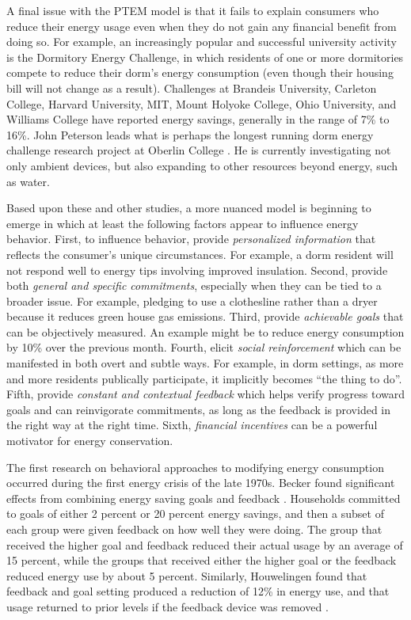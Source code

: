 A final issue with the PTEM model is that it fails to explain consumers who
reduce their energy usage even when they do not gain any financial benefit
from doing so.  For example, an increasingly popular and successful
university activity is the Dormitory Energy Challenge, in which residents
of one or more dormitories compete to reduce their dorm's energy
consumption (even though their housing bill will not change as a result).
Challenges at Brandeis University, Carleton College, Harvard University,
MIT, Mount Holyoke College, Ohio University, and Williams College have
reported energy savings, generally in the range of 7\% to 16\%.  John
Peterson leads what is perhaps the longest running dorm energy challenge
research project at Oberlin College \cite{Peterson07,Peterson07a}.  He is
currently investigating not only ambient devices, but also expanding to
other resources beyond energy, such as water.

Based upon these and other studies, a more nuanced model is beginning to
emerge in which at least the following factors appear to influence energy
behavior.  First, to influence behavior, provide {\em personalized
  information} that reflects the consumer's unique circumstances.  For
example, a dorm resident will not respond well to energy tips involving
improved insulation.  Second, provide both {\em general and specific
  commitments}, especially when they can be tied to a broader issue. For
example, pledging to use a clothesline rather than a dryer because it
reduces green house gas emissions.  Third, provide {\em achievable goals}
that can be objectively measured.  An example might be to reduce energy
consumption by 10\% over the previous month.  Fourth, elicit {\em social
  reinforcement} which can be manifested in both overt and subtle ways.  For
example, in dorm settings, as more and more residents publically
participate, it implicitly becomes ``the thing to do''.  Fifth, provide
{\em constant and contextual feedback} which helps verify progress toward
goals and can reinvigorate commitments, as long as the feedback is provided
in the right way at the right time.  Sixth, {\em financial incentives} can
be a powerful motivator for energy conservation. 

The first research on behavioral approaches to modifying energy consumption
occurred during the first energy crisis of the late 1970s. Becker found
significant effects from combining energy saving goals and feedback
\cite{Becker78} .  Households committed to goals of either 2 percent or 20
percent energy savings, and then a subset of each group were given feedback
on how well they were doing. The group that received the higher goal and
feedback reduced their actual usage by an average of 15 percent, while the
groups that received either the higher goal or the feedback reduced energy
use by about 5 percent.  Similarly, Houwelingen found that feedback and
goal setting produced a reduction of 12\% in energy use, and that usage
returned to prior levels if the feedback device was removed
\cite{Houwelingen89}.

